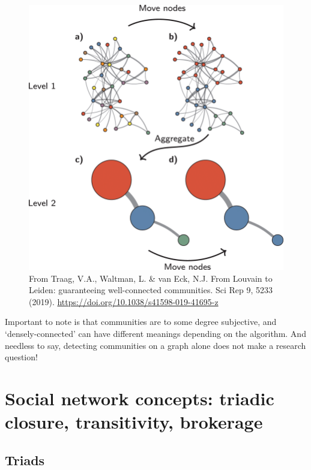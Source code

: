 \documentclass[
]{book}
\begin{document}
\begin{figure}
\centering
\includegraphics[width=5.20833in,height=\textheight]{images/louvain.png}
\caption{From Traag, V.A., Waltman, L. \& van Eck, N.J. From Louvain to Leiden: guaranteeing well-connected communities. Sci Rep 9, 5233 (2019). \url{https://doi.org/10.1038/s41598-019-41695-z}}
\end{figure}

Important to note is that communities are to some degree subjective, and `densely-connected' can have different meanings depending on the algorithm. And needless to say, detecting communities on a graph alone does not make a research question!

\hypertarget{social-network-concepts-triadic-closure-transitivity-brokerage}{%
\section{Social network concepts: triadic closure, transitivity, brokerage}\label{social-network-concepts-triadic-closure-transitivity-brokerage}}

\hypertarget{triads}{%
\subsection{Triads}\label{triads}}
\end{document}
